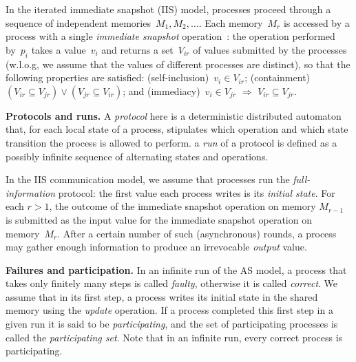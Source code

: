 \documentclass[a4paper]{article}
\newcommand{\myparagraph}[1]{\vspace{6pt}\noindent \textbf{#1}}
\def\Nat{\ensuremath{\mathbb{N}}}
\begin{document}
%
In the iterated immediate snapshot (IIS) model,
processes proceed through a sequence of independent 
memories~$M_1, M_2,\ldots$. Each memory~$M_r$ is accessed 
by a process with a single \emph{immediate snapshot} 
operation~\cite{BG93a}: the operation performed by~$p_i$ takes a
value~$v_i$ and returns a set~$V_{ir}$ of values submitted by 
the processes (w.l.o.g, we assume that the values of 
different processes are distinct), so that the following 
properties are satisfied: (self-inclusion)~$v_i \in V_{ir}$; 
(containment)~$(V_{ir}\subseteq V_{jr}) \vee (V_{jr}\subseteq V_{ir})$; and 
(immediacy)~$v_i \in V_{jr}$ $\Rightarrow$ $V_{ir}\subseteq V_{jr}$. 


\myparagraph{Protocols and runs.}
%
A \emph{protocol} here is a deterministic  distributed automaton that, for each 
local state of a process, stipulates which operation and which 
state transition the process is allowed to perform. 
a \emph{run} of a protocol is defined as a possibly infinite 
sequence of alternating states and operations.

%
In the IIS communication model, we assume that processes run the 
\emph{full-information} protocol: the first value each process 
writes is its \emph{initial state}. For each $r>1$, the outcome of 
the immediate snapshot operation on memory $M_{r-1}$ is 
submitted as the input value for the immediate snapshot 
operation on memory~$M_r$. After a certain number of such 
(asynchronous) rounds, a process may gather enough information 
to produce an irrevocable \emph{output} value.

\myparagraph{Failures and participation.}
%
In an infinite run of the AS model,
a process that takes only  finitely many steps
is called \emph{faulty}, otherwise it is called 
\emph{correct}. We assume that in its first step, a process 
writes its initial state in the shared memory using the \emph{update} operation. If a process 
completed this first step in a given run it is said to be
\emph{participating}, and the set of participating processes is called
the \emph{participating set}.
Note that in an infinite run, every correct process is participating.
\end{document}
